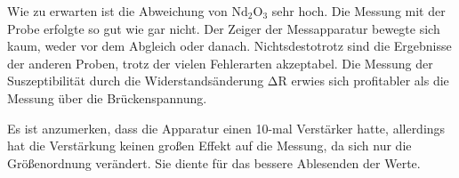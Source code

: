 \begin{flushleft}
    Wie zu erwarten ist die Abweichung von $\text{Nd}_{2}\text{O}_{3}$ sehr hoch.
    Die Messung mit der Probe erfolgte so gut wie gar nicht.
    Der Zeiger der Messapparatur bewegte sich kaum, weder vor dem Abgleich oder danach.
    Nichtsdestotrotz sind die Ergebnisse der anderen Proben, trotz der vielen Fehlerarten akzeptabel.
    Die Messung der Suszeptibilität durch die Widerstandsänderung $\increment \text{R}$ erwies sich profitabler als die Messung über die Brückenspannung.
\end{flushleft}

\begin{flushleft}
    Es ist anzumerken, dass die Apparatur einen 10-mal Verstärker hatte, allerdings hat die Verstärkung keinen großen Effekt auf die Messung, da sich nur die Größenordnung verändert.
    Sie diente für das bessere Ablesenden der Werte.
\end{flushleft}
